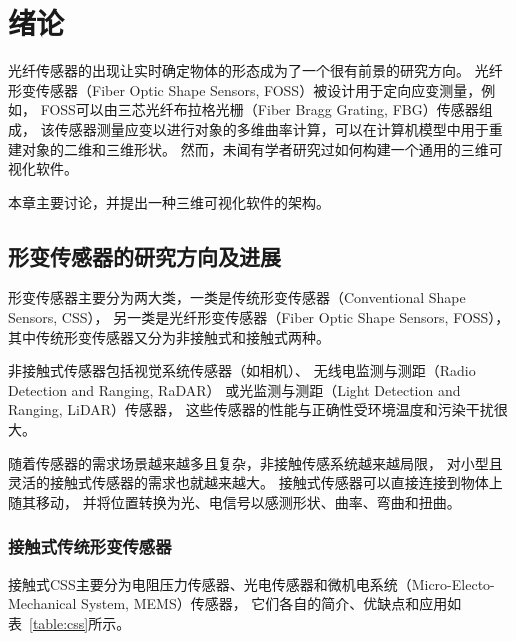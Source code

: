 \clearpage
\setcounter{page}{1}

\section{绪论}
\label{sec:intro}

光纤传感器的出现让实时确定物体的形态成为了一个很有前景的研究方向\cite{recent-dev-in-foss}。
光纤形变传感器（Fiber Optic Shape Sensors, FOSS）被设计用于定向应变测量，例如，
FOSS可以由三芯光纤布拉格光栅（Fiber Bragg Grating, FBG）传感器组成，
该传感器测量应变以进行对象的多维曲率计算，可以在计算机模型中用于重建对象的二维和三维形状。
然而，未闻有学者研究过如何构建一个通用的三维可视化软件。

本章主要讨论，并提出一种三维可视化软件的架构。

\subsection{形变传感器的研究方向及进展}
\label{sec:ss}

形变传感器主要分为两大类，一类是传统形变传感器（Conventional Shape Sensors, CSS），
另一类是光纤形变传感器（Fiber Optic Shape Sensors, FOSS）， 
其中传统形变传感器又分为非接触式和接触式两种。

非接触式传感器包括视觉系统传感器（如相机）、
无线电监测与测距（Radio Detection and Ranging, RaDAR）
或光监测与测距（Light Detection and Ranging, LiDAR）传感器，
这些传感器的性能与正确性受环境温度和污染干扰很大。

随着传感器的需求场景越来越多且复杂，非接触传感系统越来越局限，
对小型且灵活的接触式传感器的需求也就越来越大。
接触式传感器可以直接连接到物体上随其移动，
并将位置转换为光、电信号以感测形状、曲率、弯曲和扭曲。

\subsubsection{接触式传统形变传感器}

接触式CSS主要分为电阻压力传感器、光电传感器和微机电系统（Micro-Electo-Mechanical System, MEMS）传感器，
它们各自的简介、优缺点和应用如表~\ref{table:css}所示。

